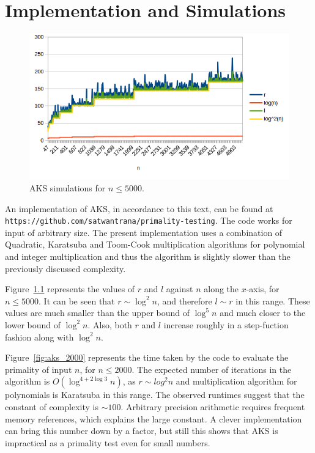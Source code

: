 \documentclass[11pt]{report}
\begin{document}
\chapter{Implementation and Simulations}
\begin{figure}
  \includegraphics[width=\linewidth]{pictures/n-r-l-5000.png}
  \caption{AKS simulations for $n \leq 5000$.}
  \label{fig:aks_5000}
\end{figure}
An implementation of AKS, in accordance to this text, can be found at \\\texttt{https://github.com/satwantrana/primality-testing}. The code works for input of arbitrary size. The present implementation uses a combination of Quadratic, Karatsuba and Toom-Cook multiplication algorithms for polynomial and integer multiplication and thus the algorithm is slightly slower than the previously discussed complexity.

Figure~\ref{fig:aks_5000} represents the values of $r$ and $l$ against $n$ along the $x$-axis, for $n \leq 5000$. It can be seen that $r \sim \log^2 n$, and therefore $l \sim r$ in this range. These values are much smaller than the upper bound of $\log^5 n$ and much closer to the lower bound of $\log^2 n$. Also, both $r$ and $l$ increase roughly in a step-fuction fashion along with $\log^2 n$. 

Figure~\ref{fig:aks_2000} represents the time taken by the code to evaluate the primality of input $n$, for $n \leq 2000$. The expected number of iterations in the algorithm is $O(\log^{4 + 2\log3} n)$, as $r \sim log^2 n$ and multiplication algorithm for polynomials is Karatsuba in this range. The observed runtimes suggest that the constant of complexity is $\sim 100$. Arbitrary precision arithmetic requires frequent memory references, which explains the large constant. A clever implementation can bring this number down by a factor, but still this shows that AKS is impractical as a primality test even for small numbers. 
\end{document}

